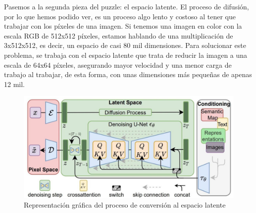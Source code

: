 Pasemos a la segunda pieza del puzzle: el espacio latente. El proceso de difusión, por lo que hemos podido ver, es un proceso algo lento y costoso al tener que trabajar con los píxeles de una imagen. Si tenemos una imagen en color con la escala RGB de 512x512 píxeles, estamos hablando de una multiplicación de 3x512x512, es decir, un espacio de casi 80 mil dimensiones. Para solucionar este problema, se trabaja con el espacio latente que trata de reducir la imagen a una escala de 64x64 píxeles, asegurando mayor velocidad y una menor carga de trabajo al trabajar, de esta forma, con unas dimensiones más pequeñas de apenas 12 mil. 

\begin{figure}[h]
	\centering
	\includegraphics[width = 1
	\textwidth]{Imagenes/Vectorial/espaciolatente.png}
	\caption{Representación gráfica del proceso de conversión al espacio latente}
	\label{fig:latentspace}
\end{figure}


